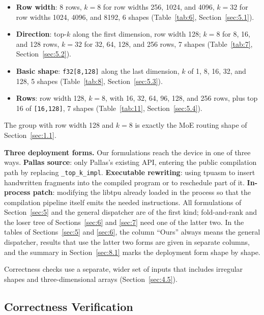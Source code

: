 \documentclass[sigconf,nonacm,balance=false]{acmart}
\newcommand{\code}[1]{\texttt{#1}}
\begin{document}
\begin{itemize}
\item \textbf{Row width}: 8 rows, $k = 8$ for row widths 256, 1024, and 4096, $k = 32$ for row widths 1024, 4096, and 8192, 6 shapes (Table~\ref{tab:6}, Section~\ref{sec:5.1}).
\item \textbf{Direction}: top-$k$ along the first dimension, row width 128; $k = 8$ for 8, 16, and 128 rows, $k = 32$ for 32, 64, 128, and 256 rows, 7 shapes (Table~\ref{tab:7}, Section~\ref{sec:5.2}).
\item \textbf{Basic shape}: \code{f32[8,\allowbreak{}128]} along the last dimension, $k$ of 1, 8, 16, 32, and 128, 5 shapes (Table~\ref{tab:8}, Section~\ref{sec:5.3}).
\item \textbf{Rows}: row width 128, $k = 8$, with 16, 32, 64, 96, 128, and 256 rows, plus top 16 of \code{[16,\allowbreak{}128]}, 7 shapes (Table~\ref{tab:11}, Section~\ref{sec:5.4}).
\end{itemize}

The group with row width 128 and $k = 8$ is exactly the MoE routing shape of Section~\ref{sec:1.1}.

\textbf{Three deployment forms.} Our formulations reach the device in one of three ways. \textbf{Pallas source}: only Pallas's existing API, entering the public compilation path by replacing \code{\_\allowbreak{}top\_\allowbreak{}k\_\allowbreak{}impl}. \textbf{Executable rewriting}: using tpuasm to insert handwritten fragments into the compiled program or to reschedule part of it. \textbf{In-process patch}: modifying the libtpu already loaded in the process so that the compilation pipeline itself emits the needed instructions. All formulations of Section~\ref{sec:5} and the general dispatcher are of the first kind; fold-and-rank and the loser tree of Sections~\ref{sec:6} and \ref{sec:7} need one of the latter two. In the tables of Sections~\ref{sec:5} and \ref{sec:6}, the column ``Ours'' always means the general dispatcher, results that use the latter two forms are given in separate columns, and the summary in Section~\ref{sec:8.1} marks the deployment form shape by shape.

Correctness checks use a separate, wider set of inputs that includes irregular shapes and three-dimensional arrays (Section~\ref{sec:4.5}).

\subsection{Correctness Verification}
\label{sec:3.6}
\end{document}
